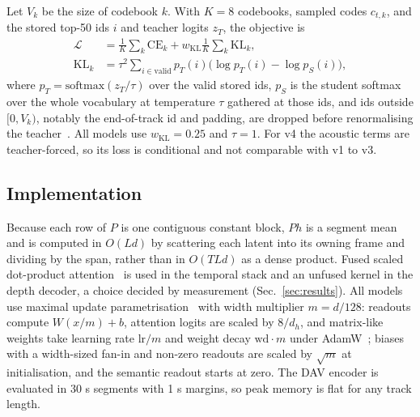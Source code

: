 Let $V_k$ be the size of codebook $k$. With $K = 8$ codebooks, sampled codes $c_{t,k}$, and the stored top-50 ids $i$ and teacher logits $z_T$, the objective is
\begin{align}
  \mathcal{L} &= \frac{1}{K}\sum_k \mathrm{CE}_k + w_{\mathrm{KL}} \frac{1}{K}\sum_k \mathrm{KL}_k, \label{eq:loss}\\
  \mathrm{KL}_k &= \tau^2 \sum_{i \in \mathrm{valid}} p_T(i)\big(\log p_T(i) - \log p_S(i)\big), \nonumber
\end{align}
where $p_T = \mathrm{softmax}(z_T / \tau)$ over the valid stored ids, $p_S$ is the student softmax over the whole vocabulary at temperature $\tau$ gathered at those ids, and ids outside $[0, V_k)$, notably the end-of-track id and padding, are dropped before renormalising the teacher~\cite{hinton2015distill}. All models use $w_{\mathrm{KL}} = 0.25$ and $\tau = 1$. For v4 the acoustic terms are teacher-forced, so its loss is conditional and not comparable with v1 to v3.

\subsection{Implementation}

Because each row of $P$ is one contiguous constant block, $P h$ is a segment mean and is computed in $O(L d)$ by scattering each latent into its owning frame and dividing by the span, rather than in $O(T L d)$ as a dense product. Fused scaled dot-product attention~\cite{dao2022flash,dao2024flash2,rabe2021memory} is used in the temporal stack and an unfused kernel in the depth decoder, a choice decided by measurement (Sec.~\ref{sec:results}). All models use maximal update parametrisation~\cite{yang2022mup} with width multiplier $m = d/128$: readouts compute $W(x/m) + b$, attention logits are scaled by $8/d_h$, and matrix-like weights take learning rate $\mathrm{lr}/m$ and weight decay $\mathrm{wd}\cdot m$ under AdamW~\cite{kingma2015adam,loshchilov2019adamw}; biases with a width-sized fan-in and non-zero readouts are scaled by $\sqrt{m}$ at initialisation, and the semantic readout starts at zero. The DAV encoder is evaluated in 30 s segments with 1 s margins, so peak memory is flat for any track length.
